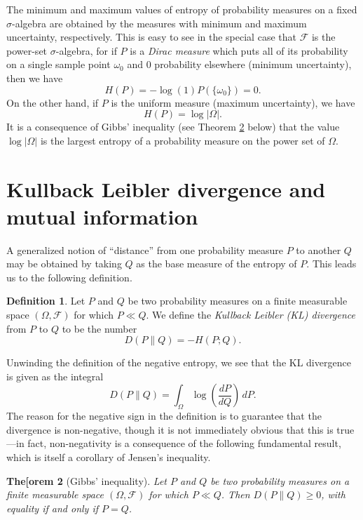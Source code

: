 \documentclass[11pt]{book}
\newtheorem{thm}{The[orem}[section]
\theoremstyle{definition}
\newtheorem{defn}[thm]{Definition}
\numberwithin{equation}{section}
\begin{document}
The minimum and maximum values of entropy of probability measures on a fixed $\sigma$-algebra are obtained by the measures with minimum and maximum uncertainty, respectively. This is easy to see in the special case that $\mathcal{F}$ is the power-set $\sigma$-algebra, for if $P$ is a \textit{Dirac measure} which puts all of its probability on a single sample point $\omega_0$ and $0$ probability elsewhere (minimum uncertainty), then we have
\[
	H(P) = - \log{\left(1\right)}P(\{\omega_0\})=0.
\]
On the other hand, if $P$ is the uniform measure (maximum uncertainty), we have
\[
	H(P) = \log{|\Omega|}.
\]
It is a consequence of Gibbs' inequality (see Theorem \ref{thm:gibbs} below) that the value $\log{|\Omega|}$ is the largest entropy of a probability measure on the power set of $\Omega$.

\section{Kullback Leibler divergence and mutual information}

A generalized notion of ``distance'' from one probability measure $P$ to another $Q$ may be obtained by taking $Q$ as the base measure of the entropy of $P$. This leads us to the following definition.

\begin{defn}
	Let $P$ and $Q$ be two probability measures on a finite measurable space $(\Omega, \mathcal{F})$ for which $P \ll Q$. We define the \textit{Kullback Leibler (KL) divergence} from $P$ to $Q$ to be the number
	\[
		D(P \parallel Q) = - H(P ; Q).
	\]
\end{defn}

Unwinding the definition of the negative entropy, we see that the KL divergence is given as the integral
\[
	D(P \parallel Q) = \int_\Omega \log { \left( \frac{dP}{dQ} \right)} \, dP.
\]
The reason for the negative sign in the definition is to guarantee that the divergence is non-negative, though it is not immediately obvious that this is true---in fact, non-negativity is a consequence of the following fundamental result, which is itself a corollary of Jensen's inequality.

\begin{thm}[Gibbs' inequality]\label{thm:gibbs}
	Let $P$ and $Q$ be two probability measures on a finite measurable space $(\Omega, \mathcal{F})$ for which $P \ll Q$. Then $D(P \parallel Q) \geq 0$, with equality if and only if $P=Q$.
\end{thm}
\end{document}
